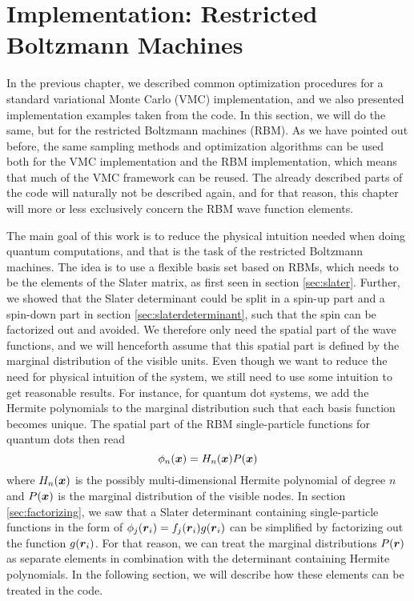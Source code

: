 \chapter{Implementation: Restricted Boltzmann Machines} \label{chp:rbmimplementation}
In the previous chapter, we described common optimization procedures for a standard variational Monte Carlo (VMC) implementation, and we also presented implementation examples taken from the code. In this section, we will do the same, but for the restricted Boltzmann machines (RBM). As we have pointed out before, the same sampling methods and optimization algorithms can be used both for the VMC implementation and the RBM implementation, which means that much of the VMC framework can be reused. The already described parts of the code will naturally not be described again, and for that reason, this chapter will more or less exclusively concern the RBM wave function elements.

The main goal of this work is to reduce the physical intuition needed when doing quantum computations, and that is the task of the restricted Boltzmann machines. The idea is to use a flexible basis set based on RBMs, which needs to be the elements of the Slater matrix, as first seen in section \ref{sec:slater}. Further, we showed that the Slater determinant could be split in a spin-up part and a spin-down part in section \ref{sec:slaterdeterminant}, such that the spin can be factorized out and avoided. We therefore only need the spatial part of the wave functions, and we will henceforth assume that this spatial part is defined by the marginal distribution of the visible units. Even though we want to reduce the need for physical intuition of the system, we still need to use some intuition to get reasonable results. For instance, for quantum dot systems, we add the Hermite polynomials to the marginal distribution such that each basis function becomes unique. The spatial part of the RBM single-particle functions for quantum dots then read
\begin{equation}
\phi_n(\boldsymbol{{x}})=H_n(\boldsymbol{{x}})P(\boldsymbol{{x}})
\end{equation}
where $H_n(\boldsymbol{{x}})$ is the possibly multi-dimensional Hermite polynomial of degree $n$ and $P(\boldsymbol{{x}})$ is the marginal distribution of the visible nodes. In section \ref{sec:factorizing}, we saw that a Slater determinant containing single-particle functions in the form of $\phi_j(\boldsymbol{{r}}_i)=f_j(\boldsymbol{{r}}_i)g(\boldsymbol{{r}}_i)$ can be simplified by factorizing out the function $g(\boldsymbol{{r}}_i)$. For that reason, we can treat the marginal distributions $P(\boldsymbol{{r}})$ as separate elements in combination with the determinant containing Hermite polynomials. In the following section, we will describe how these elements can be treated in the code. 

